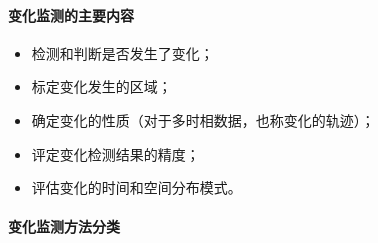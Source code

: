 \paragraph{变化监测的主要内容}
\begin{itemize}
	\item 检测和判断是否发生了变化；
	\item 标定变化发生的区域；
	\item 确定变化的性质（对于多时相数据，也称变化的轨迹）；
	\item 评定变化检测结果的精度；
	\item 评估变化的时间和空间分布模式。
\end{itemize}

\paragraph{变化监测方法分类}
